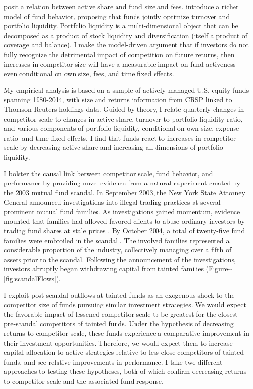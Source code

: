 \documentclass[]{book}
\theoremstyle{definition}
\theoremstyle{definition}
\theoremstyle{definition}
\theoremstyle{remark}
\begin{document}
\citet{bg04} posit a relation between active share and fund size and
fees. \citet{pst17L} introduce a richer model of fund behavior,
proposing that funds jointly optimize turnover and portfolio liquidity.
Portfolio liquidity is a multi-dimensional object that can be decomposed
as a product of stock liquidity and diversification (itself a product of
coverage and balance). I make the model-driven argument that if
investors do not fully recognize the detrimental impact of competition
on future returns, then increases in competitor size will have a
measurable impact on fund activeness even conditional on own size, fees,
and time fixed effects.

My empirical analysis is based on a sample of actively managed U.S.
equity funds spanning 1980-2014, with size and returns information from
CRSP linked to Thomson Reuters holdings data. Guided by theory, I relate
quarterly changes in competitor scale to changes in active share,
turnover to portfolio liquidity ratio, and various components of
portfolio liquidity, conditional on own size, expense ratio, and time
fixed effects. I find that funds react to increases in competitor scale
by decreasing active share and increasing all dimensions of portfolio
liquidity.

I bolster the causal link between competitor scale, fund behavior, and
performance by providing novel evidence from a natural experiment
created by the 2003 mutual fund scandal. In September 2003, the New York
State Attorney General announced investigations into illegal trading
practices at several prominent mutual fund families. As investigations
gained momentum, evidence mounted that families had allowed favored
clients to abuse ordinary investors by trading fund shares at stale
prices \citep{zitzewitz06}. By October 2004, a total of twenty-five fund
families were embroiled in the scandal \citep{hw05}. The involved
families represented a considerable proportion of the industry,
collectively managing over a fifth of assets prior to the scandal.
Following the announcement of the investigations, investors abruptly
began withdrawing capital from tainted families
(Figure\textasciitilde{}\ref{fig:scandalFlows}).

I exploit post-scandal outflows at tainted funds as an exogenous shock
to the competitor size of funds pursuing similar investment strategies.
We would expect the favorable impact of lessened competitor scale to be
greatest for the closest pre-scandal competitors of tainted funds. Under
the hypothesis of decreasing returns to competitor scale, these funds
experience a comparative improvement in their investment opportunities.
Therefore, we would expect them to increase capital allocation to active
strategies relative to less close competitors of tainted funds, and see
relative improvements in performance. I take two different approaches to
testing these hypotheses, both of which confirm decreasing returns to
competitor scale and the associated fund response.
\end{document}
